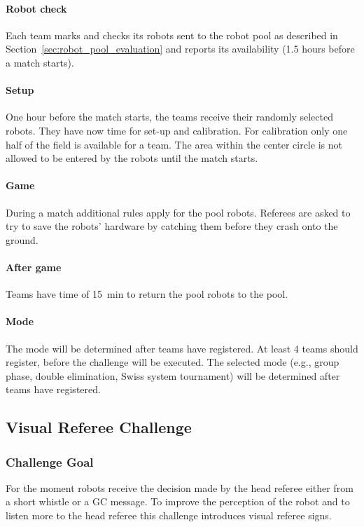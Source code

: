             \paragraph{Robot check} Each team marks and checks its robots sent to the robot pool as described in Section~\ref{sec:robot_pool_evaluation} and reports its availability (1.5 hours before a match starts). 
            \paragraph{Setup} One hour before the match starts, the teams receive their randomly selected robots. They have now time for set-up and calibration. For calibration only one half of the field is available for a team. The area within the center circle is not allowed to be entered by the robots until the match starts.
            \paragraph{Game} During a match additional rules apply for the pool robots. Referees are asked to try to save the robots' hardware by catching them before they crash onto the ground.
            \paragraph{After game} Teams have time of \qty{15}{\minute} to return the pool robots to the pool.            

        \paragraph{Mode}
            The mode will be determined after teams have registered. At least 4 teams should register, before the challenge will be executed. The selected mode (e.g., group phase, double elimination, Swiss system tournament) will be determined after teams have registered. 

\subsection{Visual Referee Challenge}

    \subsubsection{Challenge Goal}

        For the moment robots receive the decision made by the head referee either from a short whistle or a GC message. To improve the perception of the robot and to listen more to the head referee this challenge introduces visual referee signs.

